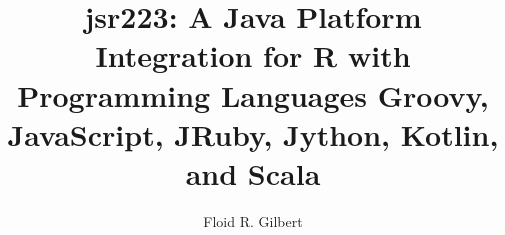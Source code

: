 \documentclass[]{statthesisMEMOIR}
\title{jsr223: A Java Platform Integration for R with Programming Languages Groovy, JavaScript, JRuby, Jython, Kotlin, and Scala}
\author{Floid R. Gilbert}
\begin{document}






\nocite{*}
	

\end{document}
